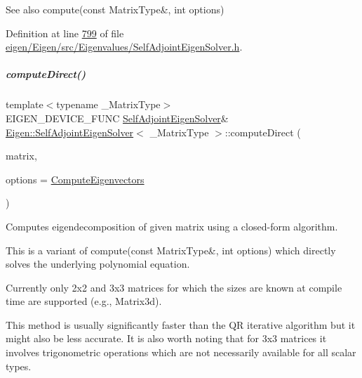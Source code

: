 \begin{DoxySeeAlso}{See also}
compute(const Matrix\+Type\&, int options) 
\end{DoxySeeAlso}


Definition at line \hyperlink{eigen_2_eigen_2src_2_eigenvalues_2_self_adjoint_eigen_solver_8h_source_l00799}{799} of file \hyperlink{eigen_2_eigen_2src_2_eigenvalues_2_self_adjoint_eigen_solver_8h_source}{eigen/\+Eigen/src/\+Eigenvalues/\+Self\+Adjoint\+Eigen\+Solver.\+h}.

\mbox{\label{group___eigenvalues___module_a569559c353a41476c72feffc3416d8f6}} 
\subparagraph{\texorpdfstring{compute\+Direct()}{computeDirect()}\hspace{0.1cm}{\footnotesize\ttfamily [2/2]}}
{\footnotesize\ttfamily template$<$typename \+\_\+\+Matrix\+Type$>$ \\
E\+I\+G\+E\+N\+\_\+\+D\+E\+V\+I\+C\+E\+\_\+\+F\+U\+NC \hyperlink{group___eigenvalues___module_class_eigen_1_1_self_adjoint_eigen_solver}{Self\+Adjoint\+Eigen\+Solver}\& \hyperlink{group___eigenvalues___module_class_eigen_1_1_self_adjoint_eigen_solver}{Eigen\+::\+Self\+Adjoint\+Eigen\+Solver}$<$ \+\_\+\+Matrix\+Type $>$\+::compute\+Direct (\begin{DoxyParamCaption}\item[{const Matrix\+Type \&}]{matrix,  }\item[{int}]{options = {\ttfamily \hyperlink{group__enums_ggae3e239fb70022eb8747994cf5d68b4a9ada93d8885bde32b876ba4af01d3292cc}{Compute\+Eigenvectors}} }\end{DoxyParamCaption})}



Computes eigendecomposition of given matrix using a closed-\/form algorithm. 

This is a variant of compute(const Matrix\+Type\&, int options) which directly solves the underlying polynomial equation.

Currently only 2x2 and 3x3 matrices for which the sizes are known at compile time are supported (e.\+g., Matrix3d).

This method is usually significantly faster than the QR iterative algorithm but it might also be less accurate. It is also worth noting that for 3x3 matrices it involves trigonometric operations which are not necessarily available for all scalar types.

